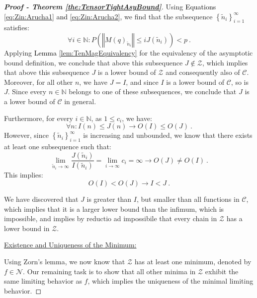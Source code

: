 \documentclass{article} %
\begin{document}
\begin{proof}[\textbf{Proof - Theorem \ref{the:TensorTightAsyBound}}]
Using \textcolor{black}{Equations} \ref{eq:Zin:Arucha1}\textcolor{black}{ and} \ref{eq:Zin:Arucha2}, we find that the subsequence \(\left\{ \tilde{n}_{i}\right\} _{i=1}^{\infty}\) satisfies:
\begin{equation}
    \forall i\in\mathbb{N}:P\left(\left\Vert M\left(q\right)_{\tilde{n}_{i}}\right\Vert \leq iJ\left(\tilde{n}_{i}\right)\right)<p \ .
\end{equation}
Applying \textcolor{black}{Lemma} \ref{lem:TenMagEquivalency} for the equivalency of the asymptotic bound definition, we conclude that above this subsequence \(J\notin\mathcal{Z}\), which implies that above this subsequence \(J\) is a lower bound of \(\mathcal{Z}\) and consequently also of \(\mathcal{C}\). Moreover, for all other \(n\), we have \(J=I\), and since \(I\) is a lower bound of \(\mathcal{C}\), so is \(J\). Since every \(n\in\mathbb{N}\) belongs to one of these subsequences, we conclude that \(J\) is a lower bound of \(\mathcal{C}\) in general.

Furthermore, for every \(i\in\mathbb{N}\), as \(1\leq c_i\), we have:
\begin{equation}
    \forall n:I(n) \leq J(n)\rightarrow O(I)\leq O(J) \ .
\end{equation}
However, since \(\left\{ \tilde{n}_{i}\right\} _{i=1}^{\infty}\) is increasing and unbounded, we know that there exists at least one subsequence such that:
\begin{equation}
\lim_{\tilde{n}_{i}\rightarrow\infty}\frac{J\left(\tilde{n}_{i}\right)}{I\left(\tilde{n}_{i}\right)}=\lim_{i\rightarrow\infty}c_{i}=\infty\rightarrow
    O\left(J\right)\neq O\left(I\right) \ .
\end{equation}
This implies:
\begin{equation}
O\left(I\right)<O\left(J\right)\rightarrow I<J \ .
\end{equation}

We have discovered that \(J\) is greater than \(I\), but smaller than all functions in \(\mathcal{C}\), which implies that it is a larger lower bound than the infimum, which is impossible, and implies by reductio ad impossibile that every chain in \(\mathcal{Z}\) has a lower bound in \(\mathcal{Z}\).

\underline{Existence and Uniqueness of the Minimum:}

Using Zorn's lemma, we now know that \(\mathcal{Z}\) has at least one minimum, denoted by \(f\in\mathcal{N}\). Our remaining task is to show that all other minima in \(\mathcal{Z}\) exhibit the same limiting behavior as \(f\), which implies the uniqueness of the minimal limiting behavior.


\end{proof}
\end{document}
